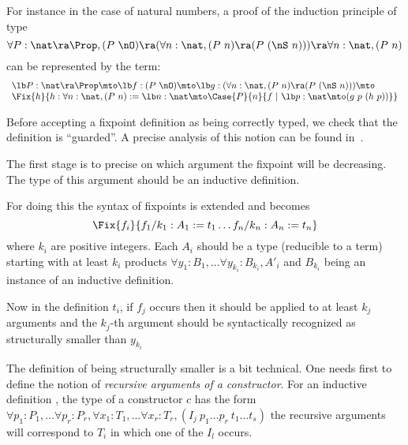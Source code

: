 For instance in the case of natural numbers, a proof of the induction
principle of type 
\[\forall P:\nat\ra\Prop, (P~\nO)\ra(\forall n:\nat, (P~n)\ra(P~(\nS~n)))\ra
\forall n:\nat, (P~n)\]
can be represented by the term:
\[\begin{array}{l}
\lb P:\nat\ra\Prop\mto\lb f:(P~\nO)\mto \lb g:(\forall n:\nat,
(P~n)\ra(P~(\nS~n))) \mto\\
\Fix{h}{h:\forall n:\nat, (P~n):=\lb n:\nat\mto \Case{P}{n}{f~|~\lb
    p:\nat\mto (g~p~(h~p))}}
\end{array}
\]

Before accepting a fixpoint definition as being correctly typed, we
check that the definition is ``guarded''. A precise analysis of this
notion can be found in~\cite{Gim94}.

The first stage is to precise on which argument the fixpoint will be
decreasing. The type of this argument should be an inductive
definition.

For doing this the syntax of fixpoints is extended and becomes 
 \[\Fix{f_i}{f_1/k_1:A_1:=t_1 \ldots f_n/k_n:A_n:=t_n}\]
where $k_i$ are positive integers.
Each $A_i$ should be a type (reducible to a term) starting with at least
$k_i$ products $\forall y_1:B_1,\ldots \forall y_{k_i}:B_{k_i}, A'_i$ 
and $B_{k_i}$
being an instance of an inductive definition.

Now in the definition $t_i$, if $f_j$ occurs then it should be applied
to at least $k_j$ arguments and the $k_j$-th argument should be
syntactically recognized as structurally smaller than $y_{k_i}$


The definition of being structurally smaller is a bit technical.
One needs first to  define the notion of 
{\em recursive arguments of a constructor}.
For an inductive definition ,
the type of a constructor $c$ has the form
$\forall p_1:P_1,\ldots \forall p_r:P_r, 
\forall x_1:T_1, \ldots \forall x_r:T_r, (I_j~p_1\ldots 
p_r~t_1\ldots  t_s)$ the recursive arguments will correspond to $T_i$ in
which one of the $I_l$ occurs.


